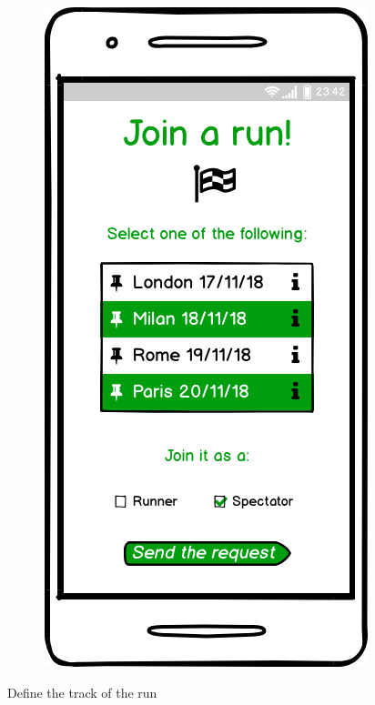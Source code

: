 \documentclass{article}
\begin{document}
\begin{legal}
\begin{legal}
\begin{legal}
\begin{legal}
\begin{figure}[H]
  						\includegraphics[scale=0.3]{./images/mockups/Join-a-run.png}
						\end{figure}
					\item Define the track of the run 
						\begin{figure}[H]
						\centering

\end{figure}
\end{legal}
\end{legal}
\end{legal}
\end{legal}
\end{document}
